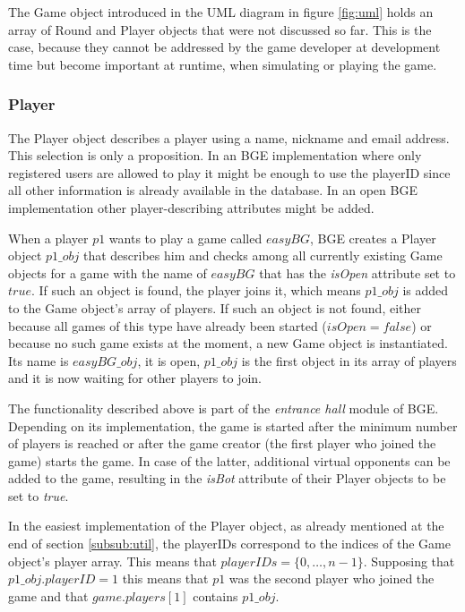 The Game object introduced in the UML diagram in figure \ref{fig:uml} holds an array of Round and Player objects that were not discussed so far. This is the case, because they cannot be addressed by the game developer at development time but become important at runtime, when simulating or playing the game.

\subsubsection{Player}
\label{subsub:player}

The Player object describes a player using a name, nickname and email address. This selection is only a proposition. In an BGE implementation where only registered users are allowed to play it might be enough to use the playerID since all other information is already available in the database. In an open BGE implementation other player-describing attributes might be added. 

When a player $p1$ wants to play a game called $easyBG$, BGE creates a Player object $p1\_obj$ that describes him and checks among all currently existing Game objects for a game with the name of $easyBG$ that has the \textit{isOpen} attribute set to $true$. If such an object is found, the player joins it, which means $p1\_obj$ is added to the Game object's array of players. If such an object is not found, either because all games of this type have already been started ($isOpen=false$) or because no such game exists at the moment, a new Game object is instantiated. Its name is $easyBG\_obj$, it is open, $p1\_obj$ is the first object in its array of players and it is now waiting for other players to join.

The functionality described above is part of the \textit{entrance hall} module of BGE. Depending on its implementation, the game is started after the minimum number of players is reached or after the game creator (the first player who joined the game) starts the game. In case of the latter, additional virtual opponents can be added to the game, resulting in the \textit{isBot} attribute of their Player objects to be set to \textit{true}. 

In the easiest implementation of the Player object, as  already mentioned at the end of section \ref{subsub:util}, the playerIDs correspond to the indices of the Game object's player array. This means that $playerIDs = \{0,\dots, n-1\}$. Supposing that $p1\_obj.playerID = 1$ this means that $p1$ was the second player who joined the game and that $game.players[1]$ contains $p1\_obj$.

